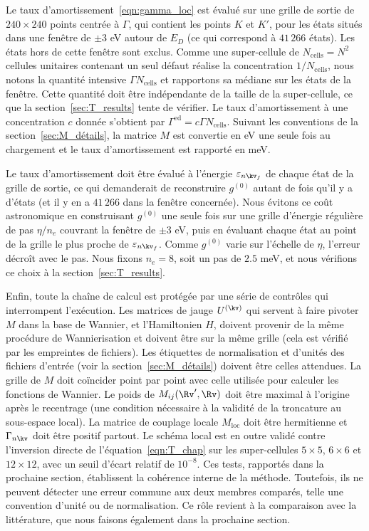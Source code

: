 Le taux d'amortissement~\eqref{eqn:gamma_loc} est évalué sur une grille de sortie de $240\times 240$ points centrée à $\Gamma$, qui contient les points $K$ et $K'$, pour les états situés dans une fenêtre de $\pm 3$ eV autour de $E_D$ (ce qui correspond à $41\,266$ états). Les états hors de cette fenêtre sont exclus. Comme une super-cellule de $N_\text{cells}=N^2$ cellules unitaires contenant un seul défaut réalise la concentration $1/N_{\text{cells}}$, nous notons la quantité intensive $\Gamma N_\text{cells}$ et rapportons sa médiane sur les états de la fenêtre. Cette quantité doit être indépendante de la taille de la super-cellule, ce que la section~\ref{sec:T_results} tente de vérifier. Le taux d'amortissement à une concentration $c$ donnée s'obtient par $\Gamma^\text{ed}=c\Gamma N_\text{cells}$. Suivant les conventions de la section~\ref{sec:M_détails}, la matrice $M$ est convertie en eV une seule fois au chargement et le taux d'amortissement est rapporté en meV.


Le taux d'amortissement doit être évalué à l'énergie $\varepsilon_{n\kv_f}$ de chaque état de la grille de sortie, ce qui demanderait de reconstruire $g^{(0)}$ autant de fois qu'il y a d'états (et il y en a $41\,266$ dans la fenêtre concernée). Nous évitons ce coût astronomique en construisant $g^{(0)}$ une seule fois sur une grille d'énergie régulière de pas $\eta/n_e$ couvrant la fenêtre de $\pm 3$ eV, puis en évaluant chaque état au point de la grille le plus proche de $\varepsilon_{n\kv_f}$. Comme $g^{(0)}$ varie sur l'échelle de $\eta$, l'erreur décroît avec le pas. Nous fixons $n_e=8$, soit un pas de $2.5$ meV, et nous vérifions ce choix à la section~\ref{sec:T_results}.


Enfin, toute la chaîne de calcul est protégée par une série de contrôles qui interrompent l'exécution. Les matrices de jauge $U^{(\kv)}$ qui servent à faire pivoter $M$ dans la base de Wannier, et l'Hamiltonien $H$, doivent provenir de la même procédure de Wannierisation et doivent être sur la même grille (cela est vérifié par les empreintes de fichiers). Les étiquettes de normalisation et d'unités des fichiers d'entrée (voir la section~\ref{sec:M_détails}) doivent être celles attendues. La grille de $M$ doit coïncider point par point avec celle utilisée pour calculer les fonctions de Wannier. Le poids de $M_{ij}(\Rv',\Rv)$ doit être maximal à l'origine après le recentrage (une condition nécessaire à la validité de la troncature au sous-espace local). La matrice de couplage locale $M_\text{loc}$ doit être hermitienne et $\Gamma_{n\kv}$ doit être positif partout. Le schéma local est en outre validé contre l'inversion directe de l'équation~\eqref{eqn:T_chap} sur les super-cellules $5\times 5$, $6\times 6$ et $12\times 12$, avec un seuil d'écart relatif de $10^{-8}$. Ces tests, rapportés dans la prochaine section, établissent la cohérence interne de la méthode. Toutefois, ils ne peuvent détecter une erreur commune aux deux membres comparés, telle une convention d'unité ou de normalisation. Ce rôle revient à la comparaison avec la littérature, que nous faisons également dans la prochaine section.

